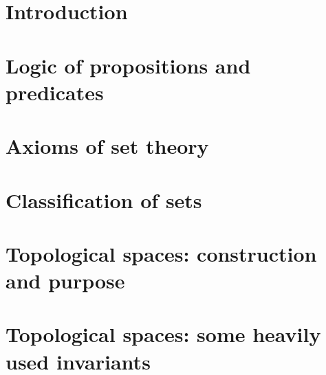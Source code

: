 \documentclass[
11pt, %
a4paper, %
twoside, %
headinclude,footinclude, %
]{scrartcl}
\begin{document}



\newpage %


\section*{Introduction}

\newpage

\section{Logic of propositions and predicates}

\newpage

\section{Axioms of set theory}

\newpage

\section{Classification of sets}

\newpage

\section{Topological spaces: construction and purpose}

\newpage

\section{Topological spaces: some heavily used invariants}

\newpage
\end{document}
